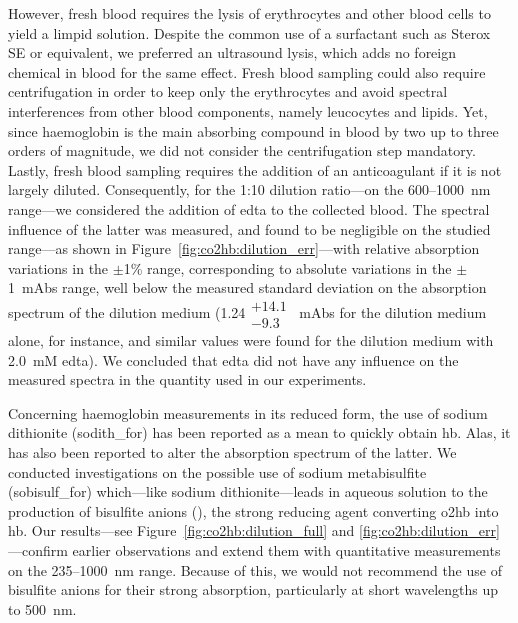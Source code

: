However, fresh blood requires the lysis of erythrocytes and other blood cells to yield a limpid solution. Despite the common use of a surfactant such as Sterox SE\cite{assendelft1970, mook1979, zijlstra1991} or equivalent\cite{horecker1943, wray1988, cope1991}, we preferred an ultrasound lysis, which adds no foreign chemical in blood for the same effect\cite{mendelson1989}. Fresh blood sampling could also require centrifugation in order to keep only the erythrocytes and avoid spectral interferences from other blood components, namely leucocytes and lipids. Yet, since haemoglobin is the main absorbing compound in blood by two up to three orders of magnitude\cite{meinke2007}, we did not consider the centrifugation step mandatory. Lastly, fresh blood sampling requires the addition of an anticoagulant if it is not largely diluted. Consequently, for the 1:10 dilution ratio---on the 600--1000~nm range---we considered the addition of \gls{edta} to the collected blood. The spectral influence of the latter was measured, and found to be negligible on the studied range---as shown in Figure~\ref{fig:co2hb:dilution_err}---with relative absorption variations in the $\pm$1\% range, corresponding to absolute variations in the $\pm$1~mAbs range, well below the measured standard deviation on the absorption spectrum of the dilution medium (1.24$\substack{+14.1 \\ -9.3}$~mAbs for the dilution medium alone, for instance, and similar values were found for the dilution medium with 2.0~mM \gls{edta}). We concluded that \gls{edta} did not have any influence on the measured spectra in the quantity used in our experiments.

Concerning haemoglobin measurements in its reduced form, the use of sodium dithionite (\gls{sodith_for}) has been reported as a mean to quickly obtain \gls{hb}\cite{barlow1962, assendelft1970, mendelson1989, robles2010, mieczkowska2011}. Alas, it has also been reported to alter the absorption spectrum of the latter\cite{dalziel1957, schubart1957, zijlstra2000}. We conducted investigations on the possible use of sodium metabisulfite (\gls{sobisulf_for}) which---like sodium dithionite---leads in aqueous solution to the production of bisulfite anions (), the strong reducing agent converting \gls{o2hb} into \gls{hb}. Our results---see Figure~\ref{fig:co2hb:dilution_full} and \ref{fig:co2hb:dilution_err}---confirm earlier observations and extend them with quantitative measurements on the 235--1000~nm range. Because of this, we would not recommend the use of bisulfite anions for their strong absorption, particularly at short wavelengths up to 500~nm.

